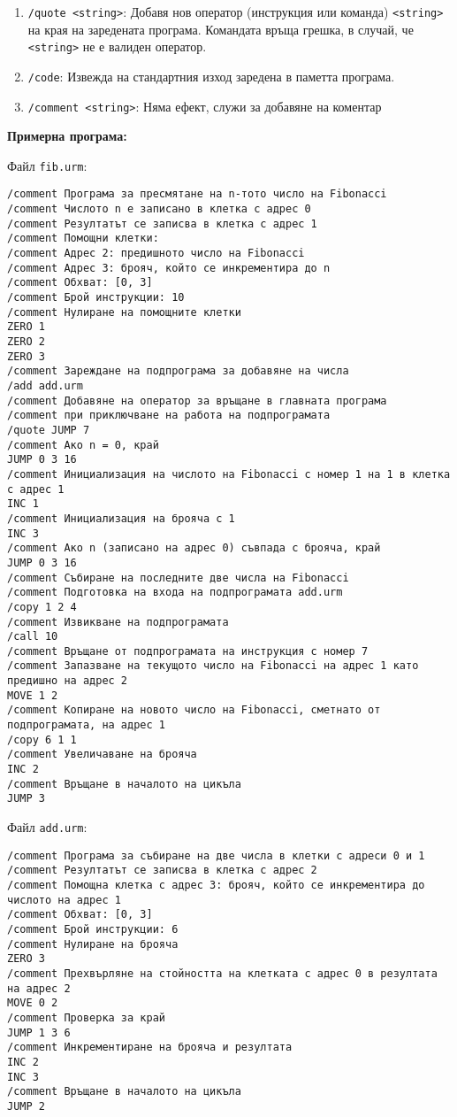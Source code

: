 \documentclass[12pt,a4paper]{article}
\newcommand{\code}[1]{\texttt{#1}}
\begin{document}
{\begin{enumerate}
    Операторите на $P$ да се добавят последователно към края на заредената в паметта програма.
    \item \code{/quote <string>}: Добавя нов оператор (инструкция или команда) \code{<string>} на края на заредената програма. Командата връща грешка, в случай, че \code{<string>} не е валиден оператор.
    \item \code{/code}: Извежда на стандартния изход заредена в паметта програма.
    \item \code{/comment <string>}: Няма ефект, служи за добавяне на коментар
    \end{enumerate}

    \textbf{Примерна програма:}

Файл \code{fib.urm}:
\begin{verbatim}
/comment Програма за пресмятане на n-тото число на Fibonacci
/comment Числото n е записано в клетка с адрес 0
/comment Резултатът се записва в клетка с адрес 1
/comment Помощни клетки:
/comment Адрес 2: предишното число на Fibonacci
/comment Адрес 3: брояч, който се инкрементира до n
/comment Обхват: [0, 3]
/comment Брой инструкции: 10
/comment Нулиране на помощните клетки
ZERO 1
ZERO 2
ZERO 3
/comment Зареждане на подпрограма за добавяне на числа
/add add.urm
/comment Добавяне на оператор за връщане в главната програма
/comment при приключване на работа на подпрограмата
/quote JUMP 7
/comment Ако n = 0, край
JUMP 0 3 16
/comment Инициализация на числото на Fibonacci с номер 1 на 1 в клетка с адрес 1
INC 1
/comment Инициализация на брояча с 1
INC 3
/comment Ако n (записано на адрес 0) съвпада с брояча, край
JUMP 0 3 16
/comment Събиране на последните две числа на Fibonacci
/comment Подготовка на входа на подпрограмата add.urm
/copy 1 2 4
/comment Извикване на подпрограмата
/call 10
/comment Връщане от подпрограмата на инструкция с номер 7
/comment Запазване на текущото число на Fibonacci на адрес 1 като предишно на адрес 2
MOVE 1 2
/comment Копиране на новото число на Fibonacci, сметнато от подпрограмата, на адрес 1
/copy 6 1 1
/comment Увеличаване на брояча
INC 2
/comment Връщане в началото на цикъла
JUMP 3
\end{verbatim}

Файл \code{add.urm}:
\begin{verbatim}
/comment Програма за събиране на две числа в клетки с адреси 0 и 1
/comment Резултатът се записва в клетка с адрес 2
/comment Помощна клетка с адрес 3: брояч, който се инкрементира до числото на адрес 1
/comment Обхват: [0, 3]
/comment Брой инструкции: 6
/comment Нулиране на брояча
ZERO 3
/comment Прехвърляне на стойността на клетката с адрес 0 в резултата на адрес 2
MOVE 0 2
/comment Проверка за край
JUMP 1 3 6
/comment Инкрементиране на брояча и резултата
INC 2
INC 3
/comment Връщане в началото на цикъла
JUMP 2
\end{verbatim}

}
\end{document}

